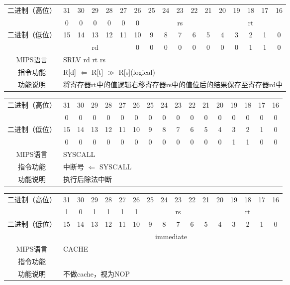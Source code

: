 \begin{table}
\begin{tabular}{|c|c|c|c|c|c|c|c|c|c|c|c|c|c|c|c|c|}
\hline
\multirow{2}{*}{二进制（高位）} &
31&30&29&28&27&26&25&24&23&22&21&20&19&18&17&16\\
\cline{2-17}
&
0&0&0&0&0&
0&
\multicolumn{5}{c|}{rs}&
\multicolumn{5}{c|}{rt}\\
\hline
\multirow{2}{*}{二进制（低位）} &
15&14&13&12&11&10&9&8&7&6&5&4&3&2&1&0\\
\cline{2-17}
&
\multicolumn{5}{c|}{rd} &
0&0&0&0&0&
0&0&0&1&1&
0\\
\hline
MIPS语言&
\multicolumn{16}{l|}{SRLV rd rt rs}\\
\hline
指令功能&
\multicolumn{16}{l|}{R[d] $\Leftarrow$ R[t] $\gg$ R[s](logical)}\\
\hline
功能说明&
\multicolumn{16}{l|}{将寄存器rt中的值逻辑右移寄存器rs中的值位后的结果保存至寄存器rd中}\\
\hline
\end{tabular}
\end{table}

\begin{table}
\begin{tabular}{|c|c|c|c|c|c|c|c|c|c|c|c|c|c|c|c|c|}
\hline
\multirow{2}{*}{二进制（高位）} &
31&30&29&28&27&26&25&24&23&22&21&20&19&18&17&16\\
\cline{2-17}
&
0&0&0&0&0&
0&0&0&0&0&
0&0&0&0&0&
0\\
\hline
\multirow{2}{*}{二进制（低位）} &
15&14&13&12&11&10&9&8&7&6&5&4&3&2&1&0\\
\cline{2-17}
&
0&0&0&0&0&
0&0&0&0&0&
0&0&1&1&0&
0\\
\hline
MIPS语言&
\multicolumn{16}{l|}{SYSCALL}\\
\hline
指令功能&
\multicolumn{16}{l|}{中断号 $\Leftarrow$ SYSCALL}\\
\hline
功能说明&
\multicolumn{16}{l|}{执行后除法中断}\\
\hline
\end{tabular}
\end{table}

\begin{table}
\begin{tabular}{|c|c|c|c|c|c|c|c|c|c|c|c|c|c|c|c|c|}
\hline
\multirow{2}{*}{二进制（高位）} &
31&30&29&28&27&26&25&24&23&22&21&20&19&18&17&16\\
\cline{2-17}
&
1&0&1&1&1&
1&
\multicolumn{5}{c|}{rs}&
\multicolumn{5}{c|}{rt}\\
\hline
\multirow{2}{*}{二进制（低位）} &
15&14&13&12&11&10&9&8&7&6&5&4&3&2&1&0\\
\cline{2-17}
&
\multicolumn{16}{c|}{immediate}\\
\hline
MIPS语言&
\multicolumn{16}{l|}{CACHE}\\
\hline
指令功能&
\multicolumn{16}{l|}{}\\
\hline
功能说明&
\multicolumn{16}{l|}{不做cache，视为NOP}\\
\hline
\end{tabular}
\end{table}

